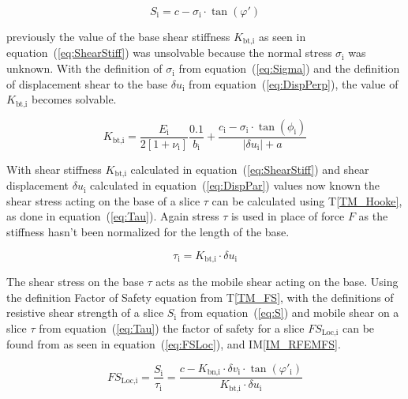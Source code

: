 \documentclass[12pt]{article}
\newcommand{\tref}[1]{T\ref{#1}}
\newcommand{\iref}[1]{IM\ref{#1}}
\begin{document}
\begin{equation}\label{eq:S}
S_{\text{i}} = c - \sigma_{\text{i}} \cdot \tan\left(\varphi'\right)
\end{equation}

\noindent
previously the value of the base shear stiffness $K_\text{bt,i}$ as
seen in equation~(\ref{eq:ShearStiff}) was unsolvable because the
normal stress $\sigma_\text{i}$ was unknown. With the definition of
$\sigma_\text{i}$ from equation~(\ref{eq:Sigma}) and the definition of
displacement shear to the base $\delta u_\text{i}$ from
equation~(\ref{eq:DispPerp}), the value of $K_\text{bt,i}$ becomes
solvable.

\begin{equation}\label{eq:ShearStiff}
K_{\text{bt,i}} = \frac{E_\text{i}}{2 \left[ 1 + \nu_\text{i} \right]}
\frac{0.1}{b_\text{i}} + \frac { c_\text{i} - \sigma_\text{i} \cdot
  \tan\left(\phi_\text{i}\right) }{ \left| \delta u_\text{i} \right| +
  a }
\end{equation}

\noindent
With shear stiffness $K_{\text{bt,i}}$ calculated in
equation~(\ref{eq:ShearStiff}) and shear displacement $\delta
u_{\text{i}}$ calculated in equation~(\ref{eq:DispPar}) values now
known the shear stress acting on the base of a slice $\tau$ can be
calculated using \tref{TM_Hooke}, as done in equation~(\ref{eq:Tau}).
Again stress $\tau$ is used in place of force $F$ as the stiffness
hasn't been normalized for the length of the base.

\begin{equation}\label{eq:Tau}
\tau_{\text{i}} = K_{\text{bt,i}} \cdot \delta u_{\text{i}}
\end{equation}

\noindent
The shear stress on the base $\tau$ acts as the mobile shear acting on
the base. Using the definition Factor of Safety equation from
\tref{TM_FS}, with the definitions of resistive shear strength of a
slice $S_\text{i}$ from equation~(\ref{eq:S}) and mobile shear on a
slice $\tau$ from equation~(\ref{eq:Tau}) the factor of safety for a
slice $FS_{\text{Loc,i}}$ can be found from as seen in
equation~(\ref{eq:FSLoc}), and \iref{IM_RFEMFS}.

\begin{equation}\label{eq:FSLoc}
FS_{\text{Loc,i}} = \frac{S_{\text{i}}}{\tau_{\text{i}}} = \frac{c -
  K_{\text{bn,i}} \cdot \delta v_{\text{i}} \cdot
  \tan\left(\varphi'_{\text{i}}\right)}{K_{\text{bt,i}} \cdot \delta
  u_{\text{i}}}
\end{equation}
\end{document}
